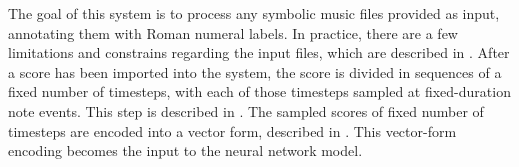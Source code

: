 

The goal of this system is to process any symbolic music
files provided as input, annotating them with Roman numeral
labels. In practice, there are a few limitations and
constrains regarding the input files, which are described in
. After a score has
been imported into the system, the score is divided in
sequences of a fixed number of timesteps, with each of those
timesteps sampled at fixed-duration note events. This step
is described in . The sampled
scores of fixed number of timesteps are encoded into a
vector form, described in .
This vector-form encoding becomes the input to the neural
network model.
